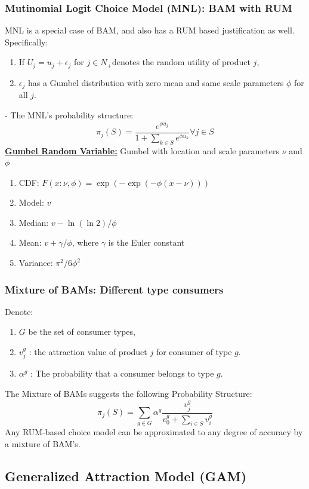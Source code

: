 \documentclass[11pt]{elegantbook}
\begin{document}
\subsubsection{Mutinomial Logit Choice Model (MNL): BAM with RUM}
MNL is a special case of BAM, and also has a RUM based justification as well. Specifically:
\begin{enumerate}[$\bullet$]
    \item If $U_{j}=u_{j}+\epsilon_{j}$ for $j \in N_{+}$denotes the random utility of product $j$,
    \item $\epsilon_{j}$ has a Gumbel distribution with zero mean and same scale parameters $\phi$ for all $j$.
\end{enumerate}
- The MNL's probability structure:
$$
\pi_{j}(S)=\frac{e^{\phi u_{j}}}{1+\sum_{k \in S} e^{\phi u_{k}}} \forall j \in S
$$
\underline{\textbf{Gumbel Random Variable:}} Gumbel with location and scale parameters $\nu$ and $\phi$
\begin{enumerate}[$\bullet$]
    \item CDF:
    $
    F(x: \nu, \phi)=\exp (-\exp (-\phi(x-\nu)))
    $
    \item Model: $v$
    \item Median: $v-\ln (\ln 2) / \phi$
    \item Mean: $v+\gamma / \phi$, where $\gamma$ is the Euler constant
    \item Variance: $\pi^{2} / 6 \phi^{2}$
\end{enumerate}

\subsubsection{Mixture of BAMs: Different type consumers}
Denote:
\begin{enumerate}[$\bullet$]
    \item $G$ be the set of consumer types,
    \item $v_{j}^{g}$ : the attraction value of product $j$ for consumer of type $g$.
    \item $\alpha^{g}$ : The probability that a consumer belongs to type $g$.
\end{enumerate}
The Mixture of BAMs suggests the following Probability Structure:
$$
\pi_{j}(S)=\sum_{g \in G} \alpha^{g} \frac{v_{j}^{g}}{v_{0}^{g}+\sum_{i \in S} v_{i}^{g}}
$$
Any RUM-based choice model can be approximated to any degree of accuracy by a mixture of BAM's.

\subsection{Generalized Attraction Model (GAM)}
\end{document}
